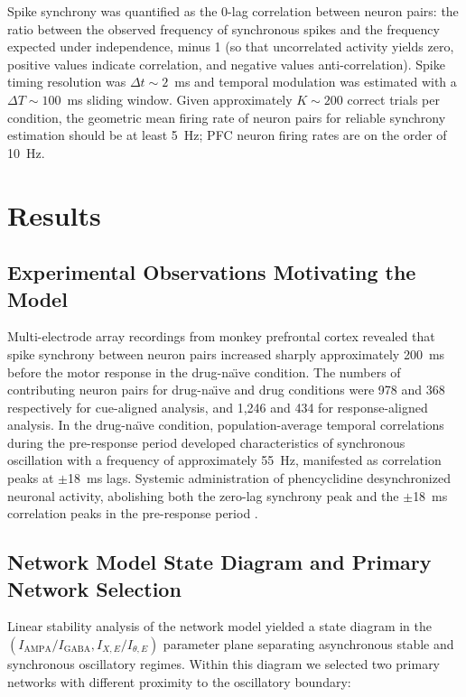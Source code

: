 \documentclass[10pt]{article}
\begin{document}
Spike synchrony was quantified as the 0-lag correlation between neuron pairs:
the ratio between the observed frequency of synchronous spikes and the
frequency expected under independence, minus 1 (so that uncorrelated activity
yields zero, positive values indicate correlation, and negative values
anti-correlation). Spike timing resolution was $\Delta t \sim 2$~ms and
temporal modulation was estimated with a $\Delta T \sim 100$~ms sliding
window. Given approximately $K \sim 200$ correct trials per condition, the
geometric mean firing rate of neuron pairs for reliable synchrony estimation
should be at least 5~Hz; PFC neuron firing rates are on the order of 10~Hz.

\section{Results}

\subsection{Experimental Observations Motivating the Model}

Multi-electrode array recordings from monkey prefrontal cortex revealed that
spike synchrony between neuron pairs increased sharply approximately 200~ms
before the motor response in the drug-na\"{\i}ve condition. The numbers of
contributing neuron pairs for drug-na\"{\i}ve and drug conditions were 978
and 368 respectively for cue-aligned analysis, and 1{,}246 and 434 for
response-aligned analysis. In the drug-na\"{\i}ve condition, population-average
temporal correlations during the pre-response period developed characteristics
of synchronous oscillation with a frequency of approximately 55~Hz, manifested
as correlation peaks at $\pm$18~ms lags. Systemic administration of
phencyclidine desynchronized neuronal activity, abolishing both the zero-lag
synchrony peak and the $\pm$18~ms correlation peaks in the pre-response
period \citep{zick2018blocking}.

\subsection{Network Model State Diagram and Primary Network Selection}

Linear stability analysis of the network model yielded a state diagram in the
$(I_{\text{AMPA}}/I_{\text{GABA}}, I_{X,E}/I_{\theta,E})$ parameter plane
separating asynchronous stable and synchronous oscillatory regimes. Within
this diagram we selected two primary networks with different proximity to
the oscillatory boundary:
\end{document}
